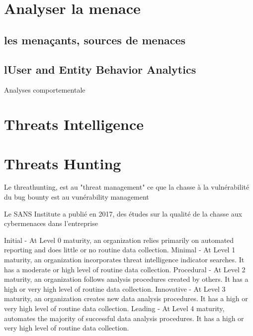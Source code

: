 

\section{Analyser la menace}



\subsection{les menaçants, sources de menaces}


\subsection{lUser and Entity Behavior Analytics}
Analyses comportementale

\section{Threats Intelligence}


\section{Threats Hunting}


Le threathunting, est au "threat management"  ce que la chasse à la vulnérabilité du bug bounty est au vunérability management

Le SANS Institute a publié en 2017, des études sur la qualité de la chasse aux cybermenaces dans l'entreprise


Initial - At Level 0 maturity, an organization relies primarily on automated reporting and does little or no routine data collection.
Minimal - At Level 1 maturity, an organization incorporates threat intelligence indicator searches. It has a moderate or high level of routine data collection.
Procedural - At Level 2 maturity, an organization follows analysis procedures created by others. It has a high or very high level of routine data collection.
Innovative - At Level 3 maturity, an organization creates new data analysis procedures. It has a high or very high level of routine data collection.
Leading - At Level 4 maturity, automates the majority of successful data analysis procedures. It has a high or very high level of routine data collection.




